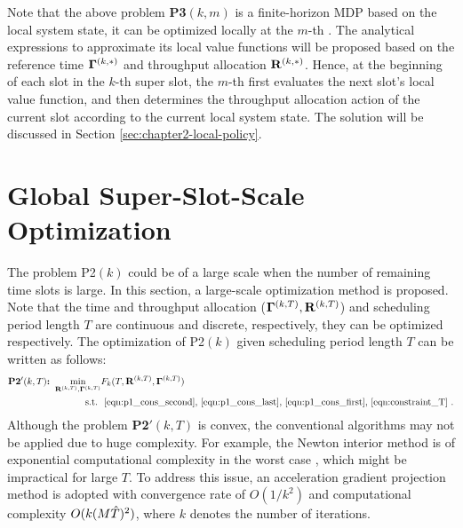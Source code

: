 Note that the above problem \textbf{P3$(k,m)$} is a finite-horizon MDP based on the local system state, it can be optimized locally at the $m$-th {\IAV}. The analytical expressions to approximate its local value functions will be proposed based on the reference time $\mathbf{\Gamma}^{(k,*)}$ and throughput allocation $\mathbf{R}^{(k,*)}$. Hence, at the beginning of each slot in the $k$-th super slot, the $m$-th {\IAV} first evaluates the next slot's local value function, and then determines the throughput allocation action of the current slot  according to the current local system state. The solution will be discussed in Section \ref{sec:chapter2-local-policy}.




\section{Global Super-Slot-Scale Optimization}
\label{sec:chapter2-kernel-policy}
The problem P2$(k)$ could be of a large scale when the number of remaining time slots is large. In this section, a large-scale optimization method is proposed.
Note that the time and throughput allocation ($\mathbf{\Gamma}^{(k,T)}, \mathbf{R}^{(k,T)}$) and scheduling period length $T$ are continuous and discrete, respectively, they can be optimized respectively. The optimization of P2$(k)$ given scheduling period length $T$ can be written as follows:
\begin{align}
    \textbf{P2$'(k,T)$:~}
    \min_{ \mathbf{R}^{(k,T)}, \mathbf{\Gamma}^{(k,T)} } &F_k( T, \mathbf{R}^{(k,T)}, \mathbf{\Gamma}^{(k,T)} )
    \\\nonumber
    \text{s.t.~} & \text{ \eqref{eqn:p1_cons_second}, \eqref{eqn:p1_cons_last}, \eqref{eqn:p1_cons_first}, \eqref{eqn:constraint_T} }.
\end{align}
Although the problem \textbf{P2$'(k,T)$} is convex, the conventional algorithms may not be applied due to huge complexity.
For example, the Newton interior method is of exponential computational complexity in the worst case \cite{monteiro1994}, which might be impractical for large $T$.
To address this issue, an acceleration gradient projection method \cite{Nesterov83} is adopted with convergence rate of $O(1/k^2)$ and computational complexity $O(k (M{\hat{T}})^2)$, where $k$ denotes the number of iterations.

